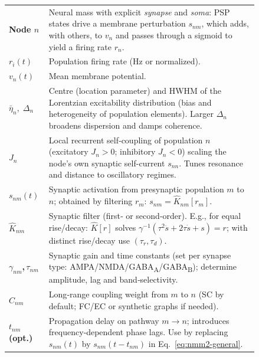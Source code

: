 \documentclass[12pt]{article}
\numberwithin{equation}{section}
\newcommand{\rev}[1]{\begingroup\color{blue}#1\endgroup}
\begin{document}
\begin{tcolorbox}[
  colback=gray!5,
  colframe=slate,
  colbacktitle=softblue!25,
  coltitle=softblue!60!black,
  fonttitle=\bfseries\small,
  title={
  \small \textit{NMM2  Network (Eq.~\ref{eq:nmm2-general})} \\ Whole-brain Simulations Parameters \& Physiological Meaning
  },
  boxrule=0.4pt, enhanced, sharp corners,
  left=4pt,right=4pt,top=3pt,bottom=3pt,
  boxsep=2pt, before skip=6pt, after skip=6pt
]
\scriptsize
\begin{tabular}{@{}l p{0.84\linewidth}@{}}
\textbf{Node $n$} & Neural mass with explicit \emph{synapse} and \emph{soma}: PSP states drive a membrane perturbation $s_{nm}$, which adds, with others, to $v_n$ and passes through a sigmoid to yield a firing rate $r_n$.\\
\textbf{$r_i(t)$}  & Population firing rate (Hz or normalized).  \\
\textbf{$v_n(t)$} & Mean membrane potential.  \\
\textbf{$\bar\eta_n,\;\Delta_n$} & \rev{Centre (location parameter) and HWHM} of the Lorentzian excitability distribution (bias and heterogeneity of population elements). Larger $\Delta_n$ broadens dispersion and damps coherence.\\
\textbf{$J_n$} & Local recurrent self‑coupling of population $n$ (excitatory $J_n\!>\!0$; inhibitory $J_n\!<\!0$) scaling the node’s own synaptic self-current $s_{nn}$. Tunes resonance and distance to oscillatory regimes.\\
\textbf{$s_{nm}(t)$} & Synaptic activation from presynaptic population $m$ to $n$; obtained by filtering $r_m$: $s_{nm}=\hat K_{nm}[r_m]$.\\
\textbf{$\hat K_{nm}$} & Synaptic filter (first‑ or second‑order). E.g., for equal rise/decay: $\hat K[r]$ solves $\gamma^{-1}(\tau^2\ddot s+2\tau\dot s+s)=r$; with distinct rise/decay use $(\tau_r,\tau_d)$.\\
\textbf{$\gamma_{nm}$,\,$\tau_{nm}$} & Synaptic gain and time constants (set per synapse type: AMPA/NMDA/GABA\textsubscript{A}/GABA\textsubscript{B}); determine amplitude, lag and band‑selectivity.\\
\textbf{$C_{nm}$} & Long‑range coupling weight from $m$ to $n$ (SC by default; FC/EC or synthetic graphs if needed).\\
\textbf{$t_{nm}$ (opt.)} & Propagation delay on pathway $m{\to}n$; introduces frequency‑dependent phase lags. Use by replacing $s_{nm}(t)$ by $s_{nm}(t-t_{nm})$ in Eq.~\ref{eq:nmm2-general}.\\

\end{tabular}
\end{tcolorbox}
\end{document}
